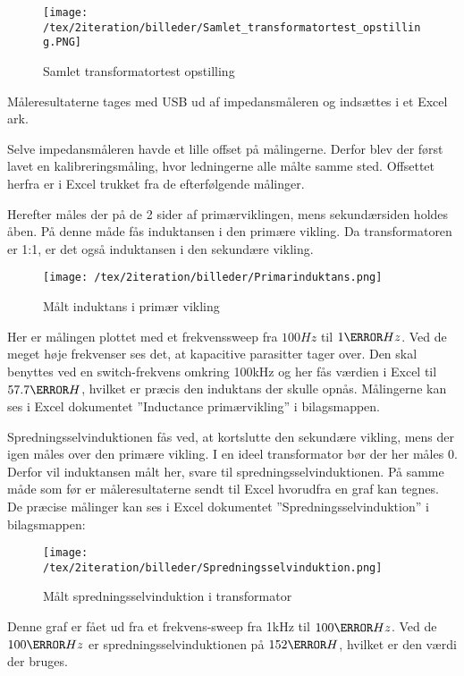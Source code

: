 \begin{figure}[H]
	\center
	\texttt{[image: /tex/2iteration/billeder/Samlet\_transformatortest\_opstilling.PNG]}
	\caption{Samlet transformatortest opstilling}
	\label{fig: Transopstilling}
\end{figure}

\noindent Måleresultaterne tages med USB ud af impedansmåleren og indsættes i et Excel ark.

\noindent Selve impedansmåleren havde et lille offset på målingerne. Derfor blev der først lavet en kalibreringsmåling, hvor ledningerne alle målte samme sted. Offsettet herfra er i Excel trukket fra de efterfølgende målinger.    

\noindent Herefter måles der på de 2 sider af primærviklingen, mens sekundærsiden holdes åben. På denne måde fås induktansen i den primære vikling. Da transformatoren er 1:1, er det også induktansen i den sekundære vikling. 
\begin{figure}[H]
	\center
	\texttt{[image: /tex/2iteration/billeder/Primarinduktans.png]}
	\caption{Målt induktans i primær vikling}
	\label{fig: Primarinduktans}
\end{figure}
\noindent Her er målingen plottet med et frekvenssweep fra $100Hz$ til $1\mega Hz$. Ved de meget høje frekvenser ses det, at kapacitive parasitter tager over. Den skal benyttes ved en switch-frekvens omkring 100kHz og her fås værdien i Excel til $57.7\micro H$, hvilket er præcis den induktans der skulle opnås. Målingerne kan ses i Excel dokumentet ”Inductance primærvikling” i bilagsmappen. 

Spredningsselvinduktionen fås ved, at kortslutte den sekundære vikling, mens der igen måles over den primære vikling. I en ideel transformator bør der her måles 0. Derfor vil induktansen målt her, svare til spredningsselvinduktionen. På samme måde som før er måleresultaterne sendt til Excel hvorudfra en graf kan tegnes. De præcise målinger kan ses i Excel dokumentet ”Spredningsselvinduktion” i bilagsmappen:
\begin{figure}[H]
	\center
	\texttt{[image: /tex/2iteration/billeder/Spredningsselvinduktion.png]}
	\caption{Målt spredningsselvinduktion i transformator}
	\label{fig: leakageinductance}
\end{figure}

\noindent Denne graf er fået ud fra et frekvens-sweep fra 1kHz til $100\kilo Hz$. Ved de $100\kilo Hz$ er spredningsselvinduktionen på $152\nano H$, hvilket er den værdi der bruges. 

